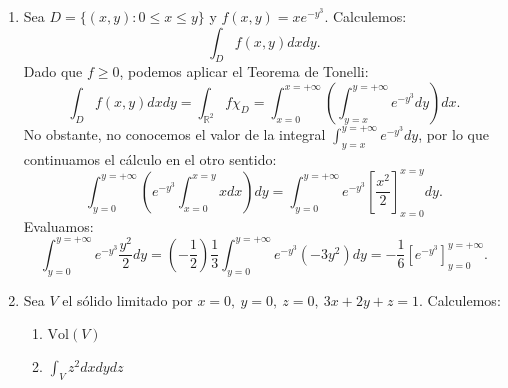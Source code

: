 {\begin{enumerate}
        \item Sea $D = \{(x,y) : 0 \leq x \leq y\}$ y $f(x,y) = xe^{-y^3}$. Calculemos:
              $$\int_{D}f(x,y)dxdy.$$ Dado que $f\geq 0$, podemos aplicar el Teorema de
              Tonelli: $$\int_{D}f(x,y)dxdy = \int_{\mathbb{R}^2}f\chi_D = \int_{x = 0}^{x =
                      +\infty}\left(\int_{y = x}^{y = +\infty}e^{-y^3}dy\right)dx.$$ No obstante, no
              conocemos el valor de la integral $\int_{y = x}^{y = +\infty}e^{-y^3}dy$, por
              lo que continuamos el cálculo en el otro sentido: $$\int_{y = 0}^{y =
                      +\infty}\left(e^{-y^3}\int_{x = 0}^{x = y}xdx\right)dy = \int_{y = 0}^{y =
                      +\infty}e^{-y^3}\left[\frac{x^2}{2}\right]^{x = y}_{x = 0}dy.$$ Evaluamos:
              $$\int_{y = 0}^{y = +\infty}e^{-y^3}\frac{y^2}{2}dy =
                  \left(-\frac{1}{2}\right)\frac{1}{3}\int_{y = 0}^{y = +\infty}e^{-y^3}(-3y^2)dy
                  = -\frac{1}{6}[e^{-y^3}]_{y = 0}^{y = +\infty}.$$

        \item Sea $V$ el sólido limitado por $x = 0, \ y = 0, \ z = 0, \ 3x + 2y +z = 1$.
              Calculemos:
              \begin{enumerate}[label=(\alph*)]
                  \item $\text{Vol}(V)$
                  \item $\int_{V}z^2dxdydz$
              \end{enumerate}
              \vspace{-1.5cm}
              \begin{center}
\end{center}
\end{enumerate}}
